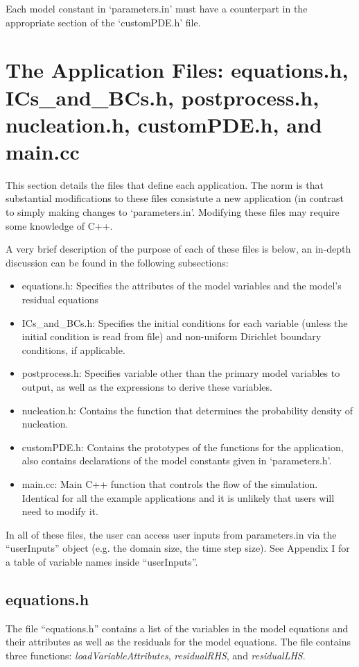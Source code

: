 \documentclass[10pt]{article} %
\begin{document}
Each model constant in `parameters.in' must have a counterpart in the appropriate section of the `customPDE.h' file. 



\section{The Application Files: equations.h, ICs\_and\_BCs.h, postprocess.h, nucleation.h, customPDE.h, and main.cc} \label{app_files}
This section details the files that define each application. The norm is that substantial modifications to these files consistute a new application (in contrast to simply making changes to `parameters.in'. Modifying these files may require some knowledge of C++.

A very brief description of the purpose of each of these files is below, an in-depth discussion can be found in the following subsections:
\begin{itemize}
\item equations.h: Specifies the attributes of the model variables and the model's residual equations
\item ICs\_and\_BCs.h: Specifies the initial conditions for each variable (unless the initial condition is read from file) and non-uniform Dirichlet boundary conditions, if applicable.
\item postprocess.h: Specifies variable other than the primary model variables to output, as well as the expressions to derive these variables.
\item nucleation.h: Contains the function that determines the probability density of nucleation.
\item customPDE.h: Contains the prototypes of the functions for the application, also contains declarations of the model constants given in `parameters.h'.
\item main.cc: Main C++ function that controls the flow of the simulation. Identical for all the example applications and it is unlikely that users will need to modify it.
\end{itemize}

In all of these files, the user can access user inputs from parameters.in via the ``userInputs'' object (e.g. the domain size, the time step size). See Appendix I for a table of variable names inside ``userInputs''.

\subsection{equations.h} \label{equations}
The file ``equations.h'' contains a list of the variables in the model equations and their attributes as well as the residuals for the model equations. The file contains three functions: \emph{loadVariableAttributes}, \emph{residualRHS}, and \emph{residualLHS}. 
\end{document}
